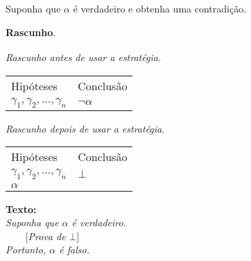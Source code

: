 \begin{ProofStrategy}\label{neg1}
Suponha que $\alpha$ é verdadeiro e obtenha uma contradição.
\begin{flushleft}
 \textbf{Rascunho}.\\
\verb| |\\

\textit{Rascunho antes de usar a estratégia}.
\verb| |\\
\begin{tabular}{ll}
Hipóteses & Conclusão \\
$\gamma_1,\gamma_2,...,\gamma_n$ & $\neg \alpha$\\
\end{tabular}

\textit{Rascunho depois de usar a estratégia}.
\verb| |\\
\begin{tabular}{ll}
Hipóteses & Conclusão \\
$\gamma_1,\gamma_2,...,\gamma_n$ & $\bot$\\
$\alpha$                                              & \\
\end{tabular}
\end{flushleft}
\begin{flushleft}
\textbf{Texto:}\\
\textit{Suponha que $\alpha$ é verdadeiro}.\\
\verb|    |[\textit{Prova de $\bot$}]\\
\textit{Portanto, $\alpha$ é falso.}
\end{flushleft}
\end{ProofStrategy}
